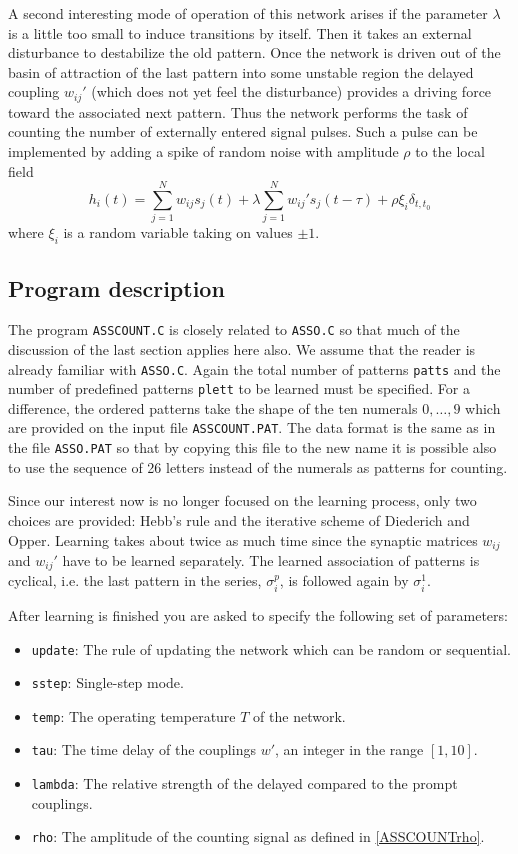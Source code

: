 A second interesting mode of operation of this network arises if the parameter $\lambda$ is a little too small to induce transitions by itself. Then it takes an external disturbance to destabilize the old pattern. Once the network is driven out of the basin of attraction of the last pattern into some unstable region the delayed coupling $w_{ij}'$ (which does not yet feel the disturbance) provides a driving force toward the associated next pattern. Thus the network performs the task of counting the number of externally entered signal pulses. Such a pulse can be implemented by adding a spike of random noise with amplitude $\rho$ to the local field
\begin{equation}\label{ASSCOUNTrho}
h_i(t)=\sum_{j=1}^Nw_{ij}s_j(t)+\lambda\sum_{j=1}^Nw_{ij}'s_j(t-\tau)+\rho\xi_i\delta_{t,t_0}
\end{equation}
where $\xi_i$ is a random variable taking on values $\pm1$.
\subsection{Program description}
The program \texttt{ASSCOUNT.C} is closely related to \texttt{ASSO.C} so that much of the discussion of the last section applies here also. We assume that the reader is already familiar with \texttt{ASSO.C}. Again the total number of patterns \texttt{patts} and the number of predefined patterns \texttt{plett} to be learned must be specified. For a difference, the ordered patterns take the shape of the ten numerals $0,\ldots,9$ which are provided on the input file \texttt{ASSCOUNT.PAT}. The data format is the same as in the file \texttt{ASSO.PAT} so that by copying this file to the new name it is possible also to use the sequence of 26 letters instead of the numerals as patterns for counting.

Since our interest now is no longer focused on the learning process, only two choices are provided: Hebb's rule and the iterative scheme of Diederich and Opper. Learning takes about twice as much time since the synaptic matrices $w_{ij}$ and $w_{ij}'$ have to be learned separately. The learned association of patterns is cyclical, i.e. the last pattern in the series, $\sigma_i^p$, is followed again by $\sigma_i^1$.

After learning is finished you are asked to specify the following set of parameters:
\begin{itemize}
\item \texttt{update}: The rule of updating the network which can be random or sequential.
\item \texttt{sstep}: Single-step mode.
\item \texttt{temp}: The operating temperature $T$ of the network.
\item \texttt{tau}: The time delay of the couplings $w'$, an integer in the range $[1,10]$.
\item \texttt{lambda}: The relative strength of the delayed compared to the prompt couplings.
\item \texttt{rho}: The amplitude of the counting signal as defined in \eqref{ASSCOUNTrho}.
\end{itemize}

